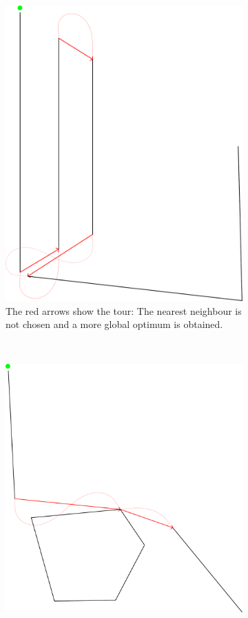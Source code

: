 \begin{figure}
\begin{subfigure}[b]{0.45\textwidth}
\includegraphics[width=1\textwidth]{images/results/TSP/TSP_Verification_1.pdf}
\caption{The red arrows show the tour: The nearest neighbour is not chosen and a more global optimum is obtained.}
\end{subfigure}
~
\begin{subfigure}[b]{0.45\textwidth}
\includegraphics[width=1\textwidth]{images/results/TSP/TSP_Verification_2.pdf}

\end{subfigure}
\end{figure}
